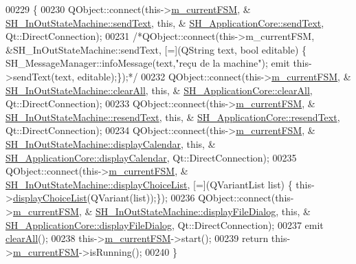 \begin{DoxyCode}
00229 \{
00230     QObject::connect(this->\hyperlink{classSH__ApplicationCore_a8e550daf4a5d49d88714b716953e4957}{m\_currentFSM}, &
      \hyperlink{classSH__InOutStateMachine_a5e7f5958bae31696b6a8deab94ad2b4f}{SH\_InOutStateMachine::sendText}, \textcolor{keyword}{this}, &
      \hyperlink{classSH__ApplicationCore_ab13d32ef84d080424469c6cecc0bf4c8}{SH\_ApplicationCore::sendText}, Qt::DirectConnection);
00231     \textcolor{comment}{/*QObject::connect(this->m\_currentFSM, &SH\_InOutStateMachine::sendText, [=](QString text, bool
       editable) \{ SH\_MessageManager::infoMessage(text,"reçu de la machine"); emit this->sendText(text, editable);\});*/}
00232     QObject::connect(this->\hyperlink{classSH__ApplicationCore_a8e550daf4a5d49d88714b716953e4957}{m\_currentFSM}, &
      \hyperlink{classSH__InOutStateMachine_aa1d5860888c96ff94c55dc77e0fdfdcf}{SH\_InOutStateMachine::clearAll}, \textcolor{keyword}{this}, &
      \hyperlink{classSH__ApplicationCore_ab03fe18921573a2566d587189173f691}{SH\_ApplicationCore::clearAll}, Qt::DirectConnection);
00233     QObject::connect(this->\hyperlink{classSH__ApplicationCore_a8e550daf4a5d49d88714b716953e4957}{m\_currentFSM}, &
      \hyperlink{classSH__InOutStateMachine_a526822c66b46aa0cd81ba4473fa5573f}{SH\_InOutStateMachine::resendText}, \textcolor{keyword}{this}, &
      \hyperlink{classSH__ApplicationCore_a83dbcb859d0d31a6487086150e430d6b}{SH\_ApplicationCore::resendText}, Qt::DirectConnection);
00234     QObject::connect(this->\hyperlink{classSH__ApplicationCore_a8e550daf4a5d49d88714b716953e4957}{m\_currentFSM}, &
      \hyperlink{classSH__InOutStateMachine_ab3a12d1f9b658d8ffdc17669a6c065f2}{SH\_InOutStateMachine::displayCalendar}, \textcolor{keyword}{this}, &
      \hyperlink{classSH__ApplicationCore_acb00dec6d5cc096ca99e8d0235dd8095}{SH\_ApplicationCore::displayCalendar}, Qt::DirectConnection);
00235     QObject::connect(this->\hyperlink{classSH__ApplicationCore_a8e550daf4a5d49d88714b716953e4957}{m\_currentFSM}, &
      \hyperlink{classSH__InOutStateMachine_ab74b981b0aab09067d7479f2b7e79b0b}{SH\_InOutStateMachine::displayChoiceList}, [=](QVariantList list) \{
      this->\hyperlink{classSH__ApplicationCore_a9e5a18f183d1e2999f86eb9f7fad0d80}{displayChoiceList}(QVariant(list));\});
00236     QObject::connect(this->\hyperlink{classSH__ApplicationCore_a8e550daf4a5d49d88714b716953e4957}{m\_currentFSM}, &
      \hyperlink{classSH__InOutStateMachine_abd206c3bc32bb7690df9c3e1cd546ebc}{SH\_InOutStateMachine::displayFileDialog}, \textcolor{keyword}{this}, &
      \hyperlink{classSH__ApplicationCore_ab69844843adf0044efc0810b1772ce5a}{SH\_ApplicationCore::displayFileDialog}, Qt::DirectConnection);
00237     emit \hyperlink{classSH__ApplicationCore_ab03fe18921573a2566d587189173f691}{clearAll}();
00238     this->\hyperlink{classSH__ApplicationCore_a8e550daf4a5d49d88714b716953e4957}{m\_currentFSM}->start();
00239     \textcolor{keywordflow}{return} this->\hyperlink{classSH__ApplicationCore_a8e550daf4a5d49d88714b716953e4957}{m\_currentFSM}->isRunning();
00240 \}
\end{DoxyCode}
